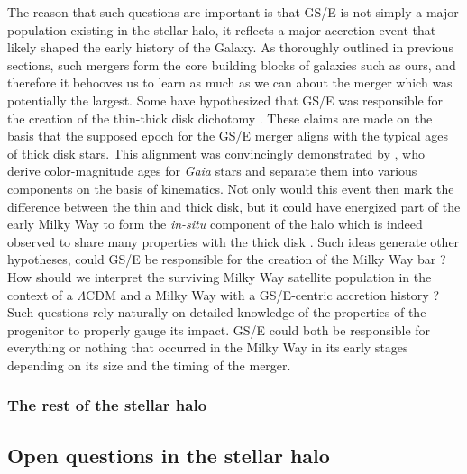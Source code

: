 The reason that such questions are important is that GS/E is not simply a major population existing in the stellar halo, it reflects a major accretion event that likely shaped the early history of the Galaxy. As thoroughly outlined in previous sections, such mergers form the core building blocks of galaxies such as ours, and therefore it behooves us to learn as much as we can about the merger which was potentially the largest. Some have hypothesized that GS/E was responsible for the creation of the thin-thick disk dichotomy \parencite{helmi18,gallart19}. These claims are made on the basis that the supposed epoch for the GS/E merger aligns with the typical ages of thick disk stars. This alignment was convincingly demonstrated by \textcite{gallart19}, who derive color-magnitude ages for \textit{Gaia} stars and separate them into various components on the basis of kinematics. Not only would this event then mark the difference between the thin and thick disk, but it could have energized part of the early Milky Way to form the \textit{in-situ} component of the halo which is indeed observed to share many properties with the thick disk \parencite{haywood18,dimatteo19,belokurov20}. Such ideas generate other hypotheses, could GS/E be responsible for the creation of the Milky Way bar \parencite[e.g.][]{fragkoudi20}? How should we interpret the surviving Milky Way satellite population in the context of a $\Lambda$CDM and a Milky Way with a GS/E-centric accretion history \parencite{bose20}? Such questions rely naturally on detailed knowledge of the properties of the progenitor to properly gauge its impact. GS/E could both be responsible for everything or nothing that occurred in the Milky Way in its early stages depending on its size and the timing of the merger.



\subsubsection{The rest of the stellar halo}


% 

\subsection{Open questions in the stellar halo}

